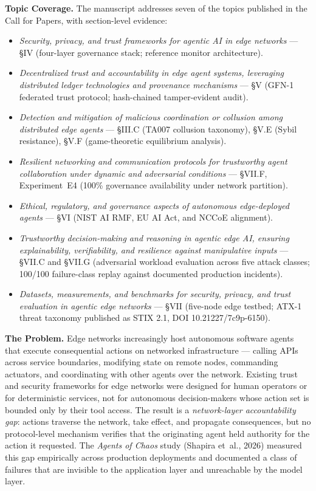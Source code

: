 \documentclass[11pt]{letter}
\begin{document}
\begin{letter}
\textbf{Topic Coverage.} The manuscript addresses seven of the topics published in the Call for Papers, with section-level evidence:

\begin{itemize}
\item \emph{Security, privacy, and trust frameworks for agentic AI in edge networks} --- \S IV (four-layer governance stack; reference monitor architecture).
\item \emph{Decentralized trust and accountability in edge agent systems, leveraging distributed ledger technologies and provenance mechanisms} --- \S V (GFN-1 federated trust protocol; hash-chained tamper-evident audit).
\item \emph{Detection and mitigation of malicious coordination or collusion among distributed edge agents} --- \S III.C (TA007 collusion taxonomy), \S V.E (Sybil resistance), \S V.F (game-theoretic equilibrium analysis).
\item \emph{Resilient networking and communication protocols for trustworthy agent collaboration under dynamic and adversarial conditions} --- \S VII.F, Experiment~E4 (100\% governance availability under network partition).
\item \emph{Ethical, regulatory, and governance aspects of autonomous edge-deployed agents} --- \S VI (NIST AI RMF, EU AI Act, and NCCoE alignment).
\item \emph{Trustworthy decision-making and reasoning in agentic edge AI, ensuring explainability, verifiability, and resilience against manipulative inputs} --- \S VII.C and \S VII.G (adversarial workload evaluation across five attack classes; 100/100 failure-class replay against documented production incidents).
\item \emph{Datasets, measurements, and benchmarks for security, privacy, and trust evaluation in agentic edge networks} --- \S VII (five-node edge testbed; ATX-1 threat taxonomy published as STIX 2.1, DOI 10.21227/7c9p-6150).
\end{itemize}

\textbf{The Problem.} Edge networks increasingly host autonomous software agents that execute consequential actions on networked infrastructure --- calling APIs across service boundaries, modifying state on remote nodes, commanding actuators, and coordinating with other agents over the network. Existing trust and security frameworks for edge networks were designed for human operators or for deterministic services, not for autonomous decision-makers whose action set is bounded only by their tool access. The result is a \emph{network-layer accountability gap}: actions traverse the network, take effect, and propagate consequences, but no protocol-level mechanism verifies that the originating agent held authority for the action it requested. The {\it Agents of Chaos} study (Shapira et~al., 2026) measured this gap empirically across production deployments and documented a class of failures that are invisible to the application layer and unreachable by the model layer.


\end{letter}
\end{document}
